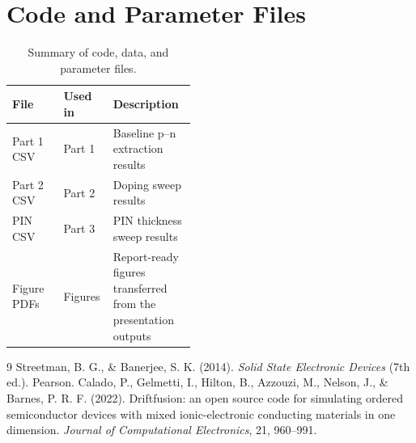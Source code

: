 \documentclass[11pt,a4paper]{article}
\begin{document}
\appendix
\section{Code and Parameter Files}

\begin{table}[htbp]
    \centering
    \caption{Summary of code, data, and parameter files.}
    \label{tab:code_files}
    \begin{tabular}{llp{0.45\linewidth}}
        \toprule
        File & Used in & Description \\
        \midrule
        Part 1 CSV & Part 1 & Baseline p--n extraction results \\
        Part 2 CSV & Part 2 & Doping sweep results \\
        PIN CSV & Part 3 & PIN thickness sweep results \\
        Figure PDFs & Figures & Report-ready figures transferred from the presentation outputs \\
        \bottomrule
    \end{tabular}
\end{table}

\begin{thebibliography}{9}
 Streetman, B. G., \& Banerjee, S. K. (2014). \textit{Solid State Electronic Devices} (7th ed.). Pearson.
 Calado, P., Gelmetti, I., Hilton, B., Azzouzi, M., Nelson, J., \& Barnes, P. R. F. (2022). Driftfusion: an open source code for simulating ordered semiconductor devices with mixed ionic-electronic conducting materials in one dimension. \textit{Journal of Computational Electronics}, 21, 960--991.
\end{thebibliography}
\end{document}
